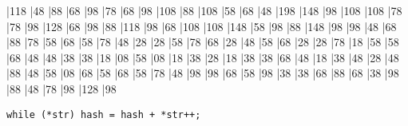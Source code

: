 \begin{slide*}
\begin{barenv}
\bar{11}{8}
\bar{4}{8}
\bar{8}{8}
\bar{6}{8}
\bar{9}{8}
\bar{7}{8}
\bar{6}{8}
\bar{9}{8}
\bar{10}{8}
\bar{8}{8}
\bar{10}{8}
\bar{5}{8}
\bar{6}{8}
\bar{4}{8}
\bar{19}{8}
\bar{14}{8}
\bar{9}{8}
\bar{10}{8}
\bar{10}{8}
\bar{7}{8}
\bar{7}{8}
\bar{9}{8}
\bar{12}{8}
\bar{6}{8}
\bar{9}{8}
\bar{8}{8}
\bar{11}{8}
\bar{9}{8}
\bar{6}{8}
\bar{10}{8}
\bar{10}{8}
\bar{14}{8}
\bar{5}{8}
\bar{9}{8}
\bar{8}{8}
\bar{14}{8}
\bar{9}{8}
\bar{9}{8}
\bar{4}{8}
\bar{6}{8}
\bar{8}{8}
\bar{7}{8}
\bar{5}{8}
\bar{6}{8}
\bar{5}{8}
\bar{7}{8}
\bar{4}{8}
\bar{2}{8}
\bar{2}{8}
\bar{5}{8}
\bar{7}{8}
\bar{6}{8}
\bar{2}{8}
\bar{4}{8}
\bar{5}{8}
\bar{6}{8}
\bar{2}{8}
\bar{2}{8}
\bar{7}{8}
\bar{1}{8}
\bar{5}{8}
\bar{5}{8}
\bar{6}{8}
\bar{4}{8}
\bar{4}{8}
\bar{3}{8}
\bar{3}{8}
\bar{1}{8}
\bar{0}{8}
\bar{5}{8}
\bar{0}{8}
\bar{1}{8}
\bar{3}{8}
\bar{2}{8}
\bar{1}{8}
\bar{3}{8}
\bar{3}{8}
\bar{6}{8}
\bar{4}{8}
\bar{1}{8}
\bar{3}{8}
\bar{4}{8}
\bar{2}{8}
\bar{4}{8}
\bar{8}{8}
\bar{4}{8}
\bar{5}{8}
\bar{0}{8}
\bar{6}{8}
\bar{5}{8}
\bar{6}{8}
\bar{5}{8}
\bar{7}{8}
\bar{4}{8}
\bar{9}{8}
\bar{9}{8}
\bar{6}{8}
\bar{5}{8}
\bar{9}{8}
\bar{3}{8}
\bar{3}{8}
\bar{6}{8}
\bar{8}{8}
\bar{6}{8}
\bar{3}{8}
\bar{9}{8}
\bar{8}{8}
\bar{4}{8}
\bar{7}{8}
\bar{9}{8}
\bar{12}{8}
\bar{9}{8}
\end{barenv}
\mbox{}\hfil{\scriptsize \verb"while (*str) hash = hash + *str++;"}\hfil


\end{slide*}
